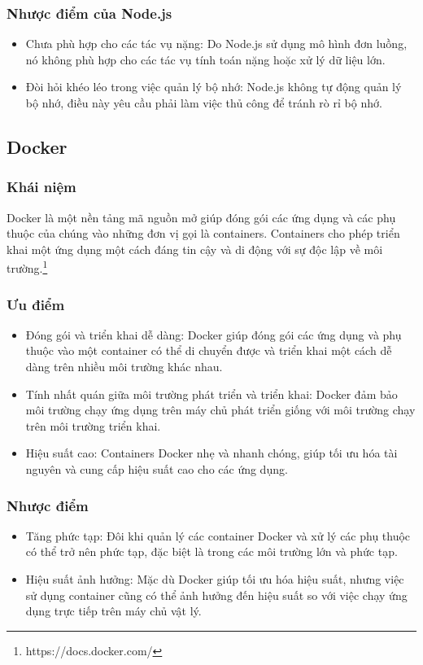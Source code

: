 \subsubsection{Nhược điểm của Node.js}
\begin{itemize}
    \item Chưa phù hợp cho các tác vụ nặng: Do Node.js sử dụng mô hình đơn luồng, nó không phù hợp cho các tác vụ tính toán nặng hoặc xử lý dữ liệu lớn.
    \item Đòi hỏi khéo léo trong việc quản lý bộ nhớ: Node.js không tự động quản lý bộ nhớ, điều này yêu cầu phải làm việc thủ công để tránh rò rỉ bộ nhớ.
\end{itemize}
\subsection{Docker}
\subsubsection{Khái niệm}
\noindent Docker là một nền tảng mã nguồn mở giúp đóng gói các ứng dụng và các phụ thuộc của chúng vào những đơn vị gọi là containers. Containers cho phép triển khai một ứng dụng một cách đáng tin cậy và di động với sự độc lập về môi trường.\footnote{https://docs.docker.com/}
\subsubsection{Ưu điểm}
\begin{itemize}
    \item Đóng gói và triển khai dễ dàng: Docker giúp đóng gói các ứng dụng và phụ thuộc vào một container có thể di chuyển được và triển khai một cách dễ dàng trên nhiều môi trường khác nhau.
    \item Tính nhất quán giữa môi trường phát triển và triển khai: Docker đảm bảo môi trường chạy ứng dụng trên máy chủ phát triển giống với môi trường chạy trên môi trường triển khai.
    \item Hiệu suất cao: Containers Docker nhẹ và nhanh chóng, giúp tối ưu hóa tài nguyên và cung cấp hiệu suất cao cho các ứng dụng.
\end{itemize}
\subsubsection{Nhược điểm}
\begin{itemize}
    \item Tăng phức tạp: Đôi khi quản lý các container Docker và xử lý các phụ thuộc có thể trở nên phức tạp, đặc biệt là trong các môi trường lớn và phức tạp.
    \item Hiệu suất ảnh hưởng: Mặc dù Docker giúp tối ưu hóa hiệu suất, nhưng việc sử dụng container cũng có thể ảnh hưởng đến hiệu suất so với việc chạy ứng dụng trực tiếp trên máy chủ vật lý.
\end{itemize}

